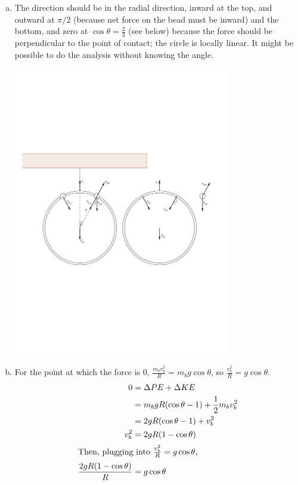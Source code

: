 \documentclass{esg8012pset}
\begin{document}
\begin{solution}
\begin{enumerate}[a)]
 \item The direction should be in the radial direction, inward at the top, and outward at $\pi/2$ (because net force on the bead must be inward) and the bottom, and zero at $\cos\theta = \frac{2}{3}$ (see below) because the force should be perpendicular to the point of contact; the circle is locally linear.  It might be possible to do the analysis without knowing the angle. \par
 \begin{center}\includegraphics[width=0.75\textwidth]{2009-10-23_Diagram_7_1}\end{center}
 \item For the point at which the force is 0, $\frac{m_b v_b^2}{R} = m_b g\cos\theta$, so $\frac{v_b^2}{R} = g\cos\theta$.
   \begin{align*}
     0 & = \Delta PE + \Delta KE \\
       & = m_b g R(\cos\theta - 1) + \frac{1}{2}m_b v_b^2 \\
       & = 2 g R (\cos\theta - 1) + v_b^2 \\
     v_b^2 & = 2 g R(1 - \cos\theta) \\
     \intertext{Then, plugging into $\frac{v_b^2}{R} = g\cos\theta$,}
     \frac{2 g R(1 - \cos\theta)}{R} & = g\cos\theta \\

\end{align*}
\end{enumerate}
\end{solution}
\end{document}
